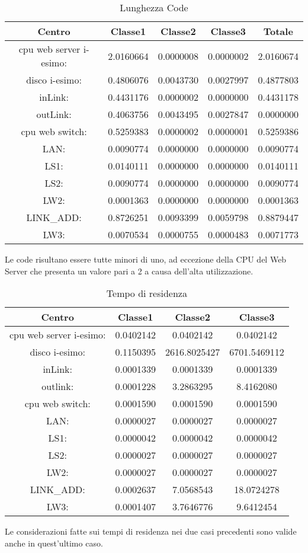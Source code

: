 \begin{table}[H]
\begin{center}
\begin{tabular}{||c|c|c|c|c||}
\hline
Centro &Classe1 &Classe2 &Classe3 &Totale\\
\hline
\hline
 cpu web server i-esimo: 	&2.0160664	&0.0000008	&0.0000002	&2.0160674	\\\hline
 disco i-esimo: 	&0.4806076	&0.0043730	&0.0027997	&0.4877803	\\\hline
 inLink: 	&0.4431176	&0.0000002	&0.0000000	&0.4431178	\\\hline
 outLink: 	&0.4063756	&0.0043495	&0.0027847	&0.0000000	\\\hline
 cpu web switch: 	&0.5259383	&0.0000002	&0.0000001	&0.5259386	\\\hline
 LAN: 	&0.0090774	&0.0000000	&0.0000000	&0.0090774	\\\hline
 LS1: 	&0.0140111	&0.0000000	&0.0000000	&0.0140111	\\\hline
 LS2: 	&0.0090774	&0.0000000	&0.0000000	&0.0090774	\\\hline
 LW2: 	&0.0001363	&0.0000000	&0.0000000	&0.0001363	\\\hline
 LINK_ADD: 	&0.8726251	&0.0093399	&0.0059798	&0.8879447	\\\hline
 LW3: 	&0.0070534	&0.0000755	&0.0000483	&0.0071773	\\\hline
\end{tabular}
\end{center}
\caption{Lunghezza Code}
\label{lunghezzacode}
\end{table}
Le code risultano essere tutte minori di uno, ad eccezione della CPU del Web Server che presenta un valore pari a 2 a causa dell'alta utilizzazione.
\begin{table}[H]
\begin{center}
\begin{tabular}{||c|c|c|c||}
\hline
Centro &Classe1 &Classe2 &Classe3\\
\hline
\hline
 cpu web server i-esimo: 	&0.0402142	&0.0402142	&0.0402142	\\\hline
 disco i-esimo: 	&0.1150395	&2616.8025427	&6701.5469112	\\\hline
 inLink: 	&0.0001339	&0.0001339	&0.0001339	\\\hline
 outlink: 	&0.0001228	&3.2863295	&8.4162080	\\\hline
 cpu web switch: 	&0.0001590	&0.0001590	&0.0001590	\\\hline
 LAN: 	&0.0000027	&0.0000027	&0.0000027	\\\hline
 LS1: 	&0.0000042	&0.0000042	&0.0000042	\\\hline
 LS2: 	&0.0000027	&0.0000027	&0.0000027	\\\hline
 LW2: 	&0.0000027	&0.0000027	&0.0000027	\\\hline
 LINK_ADD: 	&0.0002637	&7.0568543	&18.0724278	\\\hline
 LW3: 	&0.0001407	&3.7646776	&9.6412454	\\\hline\hline
\end{tabular}
\end{center}
\caption{Tempo di residenza}
\label{tempodiresidenza}
\end{table}
Le considerazioni fatte sui tempi di residenza nei due casi precedenti sono valide anche in quest'ultimo caso. 
